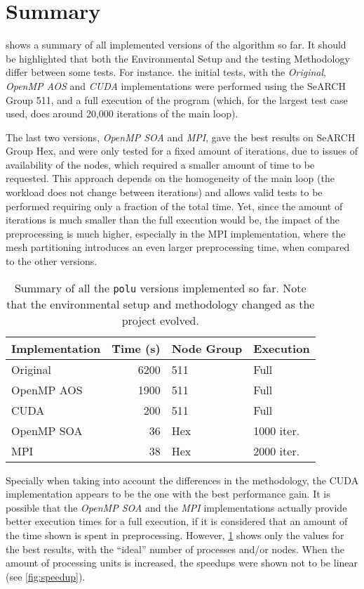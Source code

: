 \section{Summary}
\label{sec:summary}

 shows a summary of all implemented versions of the algorithm so far. It should be highlighted that both the Environmental Setup and the testing Methodology differ between some tests. For instance. the initial tests, with the \textit{Original}, \textit{OpenMP AOS} and \textit{CUDA} implementations were performed using the SeARCH Group 511, and a full execution of the program (which, for the largest test case used, does around 20,000 iterations of the main loop).

The last two versions, \textit{OpenMP SOA} and \textit{MPI}, gave the best results on SeARCH Group Hex, and were only tested for a fixed amount of iterations, due to issues of availability of the nodes, which required a smaller amount of time to be requested. This approach depends on the homogeneity of the main loop (the workload does not change between iterations) and allows valid tests to be performed requiring only a fraction of the total time. Yet, since the amount of iterations is much smaller than the full execution would be, the impact of the preprocessing is much higher, especially in the MPI implementation, where the mesh partitioning introduces an even larger preprocessing time, when compared to the other versions.

\begin{table}[!htp]
		\smaller
		\begin{center}
			\begin{tabular}{l r ll}
			\hline
			\textbf{Implementation} & \textbf{\~ Time (s)}  & \textbf{Node Group}	& \textbf{Execution}	\\ \hline
			Original				& 6200				& 511				& Full							\\
			OpenMP AOS				& 1900				& 511				& Full							\\
			CUDA 					& 200				& 511 				& Full							\\ \hline
			OpenMP SOA 				& 36				& Hex 				& 1000 iter.					\\
			MPI 					& 38				& Hex 				& 2000 iter.					\\
			\hline
			\end{tabular}
		\end{center}
		\caption{Summary of all the \texttt{polu} versions implemented so far. Note that the environmental setup and methodology changed as the project evolved.}
		\label{tab:summary}
	\end{table}

Specially when taking into account the differences in the methodology, the CUDA implementation appears to be the one with the best performance gain. It is possible that the \textit{OpenMP SOA} and the \textit{MPI} implementations actually provide better execution times for a full execution, if it is considered that an amount of the time shown is spent in preprocessing. However, \cref{tab:summary} shows only the values for the best results, with the ``ideal'' number of processes and/or nodes. When the amount of processing units is increased, the speedups were shown not to be linear (see \cref{fig:speedup}).